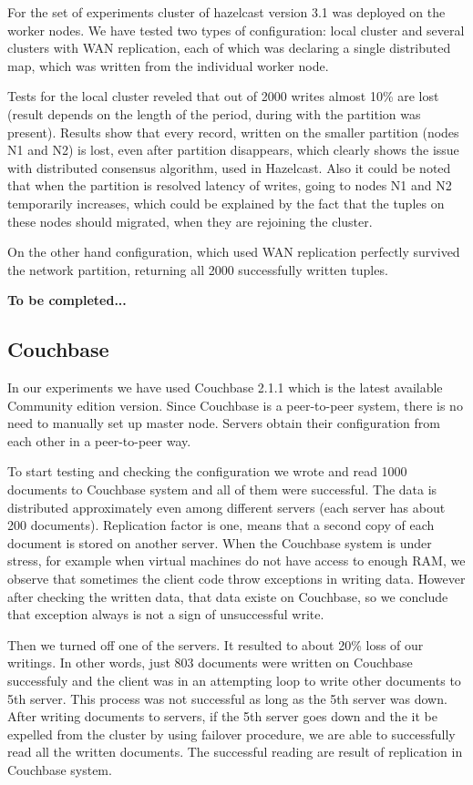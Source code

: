 \documentclass[a4paper]{article}
\begin{document}
For the set of experiments cluster of hazelcast version 3.1 was deployed on the worker nodes. 
We have tested two types of configuration: local cluster and several clusters with WAN replication, each of which was declaring a single distributed map, which was written from the individual worker node.

Tests for the local cluster reveled that out of 2000 writes almost 10\% are lost (result depends on the length of the period, during with the partition was present).
Results show that every record, written on the smaller partition (nodes N1 and N2) is lost, even after partition disappears, which clearly shows the issue with distributed consensus algorithm, used in Hazelcast.
Also it could be noted that when the partition is resolved latency of writes, going to nodes N1 and N2 temporarily increases, which could be explained by the fact that the tuples on these nodes should migrated, when they are rejoining the cluster.

On the other hand configuration, which used WAN replication perfectly survived the network partition, returning all 2000 successfully written tuples.

{\bf To be completed...}

\subsection{Couchbase}

In our experiments we have used Couchbase 2.1.1 which is the latest available Community edition version. 
Since Couchbase is a peer-to-peer system, there is no need to manually set up master node. 
Servers obtain their configuration from each other in a peer-to-peer way.

To start testing and checking the configuration we wrote and read 1000 documents to Couchbase system and all of them were successful. 
The data is distributed approximately even among different servers (each server has about 200 documents).
Replication factor is one, means that a second copy of each document is stored on another server.
When the Couchbase system is under stress, for example when virtual machines do not have access to enough RAM, we observe that sometimes the client code throw exceptions in writing data.
However after checking the written data, that data existe on Couchbase, so we conclude that exception always is not a sign of unsuccessful write.  

Then we turned off one of the servers. 
It resulted to about 20\% loss of our writings.
In other words, just 803 documents were written on Couchbase successfuly and the client was in an attempting loop to write other documents to 5th server.
This process was not successful as long as the 5th server was down.
After writing documents to servers, if the 5th server goes down and the it be expelled from the cluster by using failover procedure, we are able to successfully read all the written documents. The successful reading are result of replication in Couchbase system.
\end{document}
